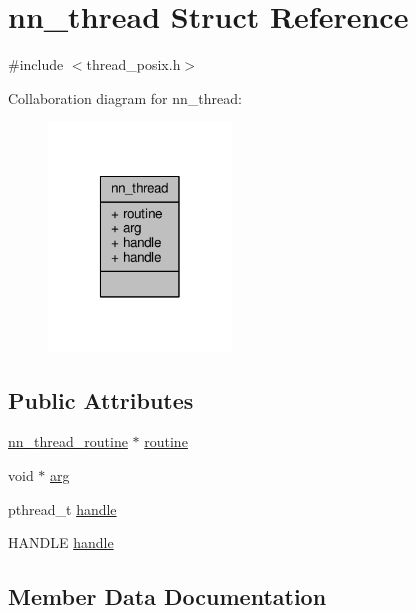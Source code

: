 \hypertarget{structnn__thread}{}\section{nn\+\_\+thread Struct Reference}
\label{structnn__thread}


{\ttfamily \#include $<$thread\+\_\+posix.\+h$>$}



Collaboration diagram for nn\+\_\+thread\+:\nopagebreak
\begin{figure}[H]
\begin{center}
\leavevmode
\includegraphics[width=138pt]{structnn__thread__coll__graph}
\end{center}
\end{figure}
\subsection*{Public Attributes}
\begin{DoxyCompactItemize}
\item 
\hyperlink{thread_8h_a44adfd05c0058506630e9e671222c543}{nn\+\_\+thread\+\_\+routine} $\ast$ \hyperlink{structnn__thread_a9f262c0e7e21082e8a5cbe2bd3cb2dc6}{routine}
\item 
void $\ast$ \hyperlink{structnn__thread_acdc3ce75ed1be5edd45764f32d929de6}{arg}
\item 
pthread\+\_\+t \hyperlink{structnn__thread_a716d0a3bb39d4fcba65b05cafeb16f44}{handle}
\item 
H\+A\+N\+D\+LE \hyperlink{structnn__thread_ab4a5499c56bbf976118c18587f923705}{handle}
\end{DoxyCompactItemize}


\subsection{Member Data Documentation}
